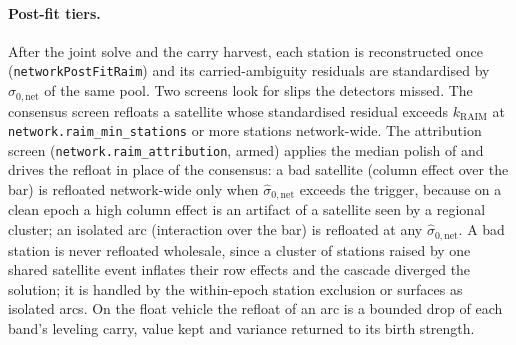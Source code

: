 \documentclass[main.tex]{subfiles}
\begin{document}
\paragraph{Post-fit tiers.}
After the joint solve and the carry harvest, each station is reconstructed
once (\texttt{networkPostFitRaim}) and its carried-ambiguity residuals are
standardised by $\hat\sigma_{0,\mathrm{net}}$ of the same pool.  Two screens
look for slips the detectors missed.  The consensus screen refloats a satellite
whose standardised residual exceeds $k_{\mathrm{RAIM}}$ at
\texttt{network.raim\_min\_stations} or more stations network-wide.  The
attribution screen (\texttt{network.raim\_attribution}, armed) applies the median
polish of  and drives the refloat in place of the
consensus: a bad satellite (column effect over the bar) is refloated
network-wide only when $\hat\sigma_{0,\mathrm{net}}$ exceeds the trigger, because on
a clean epoch a high column effect is an artifact of a satellite seen by a
regional cluster; an isolated arc (interaction over the bar) is refloated at any
$\hat\sigma_{0,\mathrm{net}}$.  A bad station is never refloated wholesale, since
a cluster of stations raised by one shared satellite event inflates their row
effects and the cascade diverged the solution; it is handled by the
within-epoch station exclusion or surfaces as isolated arcs.  On the float
vehicle the refloat of an arc is a bounded drop of each band's leveling carry,
value kept and variance returned to its birth strength.
\end{document}
